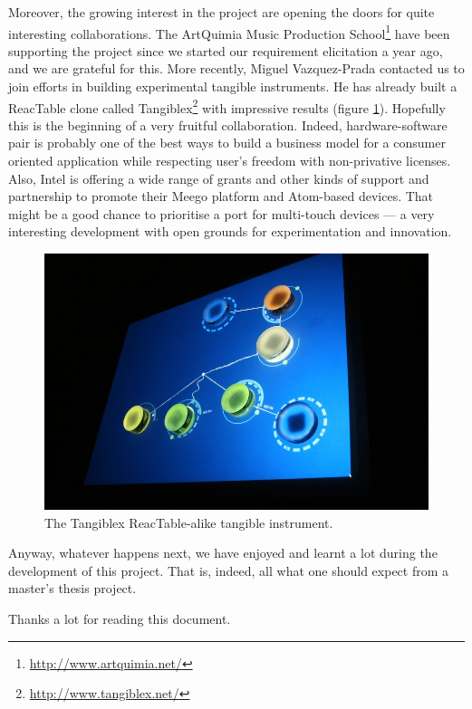 Moreover, the growing interest in the project are opening the doors
for quite interesting collaborations. The ArtQuimia Music Production
School\footnote{\url{http://www.artquimia.net/}} have been supporting
the project since we started our requirement elicitation a year ago,
and we are grateful for this. More recently, Miguel Vazquez-Prada
contacted us to join efforts in building experimental tangible
instruments. He has already built a ReacTable clone called
Tangiblex\footnote{\url{http://www.tangiblex.net/}} with impressive
results (figure \ref{fig:tangiblex}). Hopefully this is the beginning
of a very fruitful collaboration. Indeed, hardware-software pair is
probably one of the best ways to build a business model for a consumer
oriented application while respecting user's freedom with
non-privative licenses. Also, Intel is offering a wide range of grants
and other kinds of support and partnership to promote their Meego
platform and Atom-based devices. That might be a good chance to
prioritise a port for multi-touch devices --- a very interesting
development with open grounds for experimentation and innovation.

\begin{figure}[h!]
  \centering
  \includegraphics[width=\textwidth]{pic/fidumusic.jpg}
  \caption{The Tangiblex ReacTable-alike tangible instrument.}
  \label{fig:tangiblex}
\end{figure}

Anyway, whatever happens next, we have enjoyed and learnt a lot during
the development of this project. That is, indeed, all what one should
expect from a master's thesis project.

Thanks a lot for reading this document.

